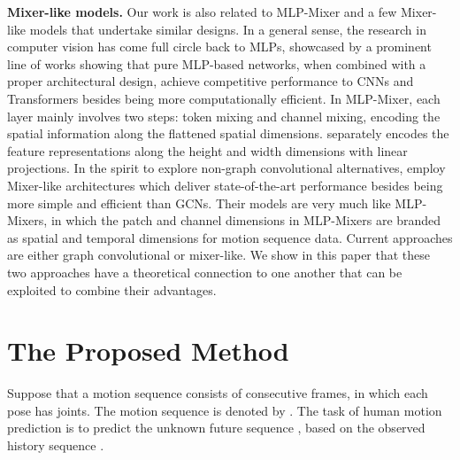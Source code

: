 \documentclass[10pt,twocolumn,letterpaper]{article}
\begin{document}
\noindent\textbf{Mixer-like models.}
    Our work is also related to MLP-Mixer \cite{tolstikhin2021mlp} and a few Mixer-like models that undertake similar designs.
In a general sense, the research in computer vision has come full circle back to MLPs, showcased by a prominent line of works
    \cite{tolstikhin2021mlp,touvron2022resmlp,hou2022vision,yu2022s2,guo2022hire,tang2022sparse,tu2022maxim} showing that pure MLP-based networks, when combined with a proper architectural design, achieve competitive performance to CNNs and Transformers \cite{vaswani2017attention} besides being more computationally efficient.
    In MLP-Mixer, each layer mainly involves two steps: token mixing and channel mixing, encoding the spatial information along the flattened spatial dimensions. \cite{hou2022vision} separately encodes the feature representations along the height and width dimensions with linear projections.
In the spirit to explore non-graph convolutional alternatives, \cite{bouazizi2022motionmixer,guo2023back} employ Mixer-like architectures which deliver state-of-the-art performance besides being more simple and efficient than GCNs. Their models are very much like MLP-Mixers, in which the patch and channel dimensions in MLP-Mixers are branded as spatial and temporal dimensions for motion sequence data.
    Current approaches are either graph convolutional or mixer-like.
    We show in this paper that these two approaches have a theoretical connection to one another that can be exploited to combine their advantages.















\section{The Proposed Method}


Suppose that a motion sequence consists of  consecutive frames, in which each pose has  joints.
The motion sequence is denoted by .
The task of human motion prediction is to predict the unknown future sequence , based on the observed history sequence .
\end{document}
